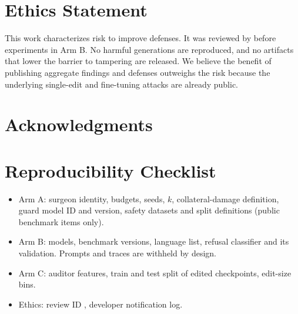 \documentclass[11pt]{article}
\begin{document}
\section*{Ethics Statement}
This work characterizes risk to improve defenses. It was reviewed by \xx{} before experiments in Arm B. No harmful generations are reproduced, and no artifacts that lower the barrier to tampering are released. We believe the benefit of publishing aggregate findings and defenses outweighs the risk because the underlying single-edit and fine-tuning attacks are already public.

\section*{Acknowledgments}



\appendix
\section{Reproducibility Checklist}
\begin{itemize}\itemsep0pt
\item Arm A: surgeon identity, budgets, seeds, $k$, collateral-damage definition, guard model ID and version, safety datasets and split definitions (public benchmark items only).
\item Arm B: models, benchmark versions, language list, refusal classifier and its validation. Prompts and traces are withheld by design.
\item Arm C: auditor features, train and test split of edited checkpoints, edit-size bins.
\item Ethics: review ID \xx{}, developer notification log.
\end{itemize}
\end{document}
